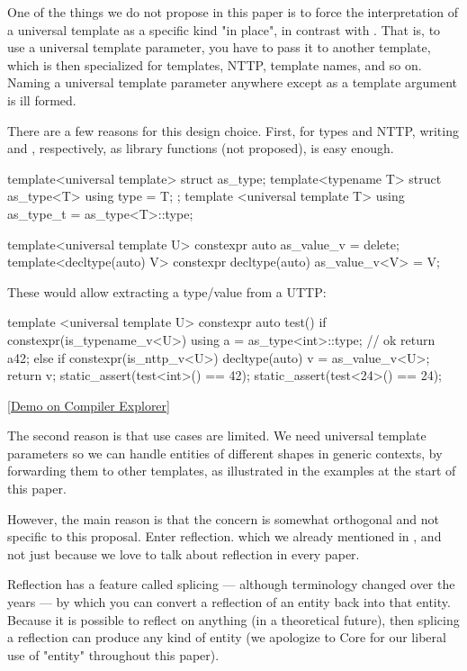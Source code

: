 \documentclass{wg21}
\begin{document}
One of the things we do not propose in this paper is to force the interpretation of a universal template as a specific kind "in place", in contrast with .
That is, to use a universal template parameter, you have to pass it to another template, which is then specialized for templates, NTTP, template names, and so on.
Naming a universal template parameter anywhere except as a template argument is ill formed.

There are a few reasons for this design choice.
First, for types and NTTP, writing  and , respectively, as library functions (not proposed), is easy enough.

\begin{colorblock}
template<universal template>
struct as_type;
template<typename T>
struct as_type<T> { using type = T; };
template <universal template T>
using as_type_t = as_type<T>::type;

template<universal template U>
constexpr auto as_value_v = delete;
template<decltype(auto) V>
constexpr decltype(auto) as_value_v<V> = V;
\end{colorblock}

These would allow extracting a type/value from a UTTP:

\begin{colorblock}
template <universal template U>
constexpr auto test() {
    if constexpr(is_typename_v<U>) {
        using a =  as_type<int>::type; // ok
        return a{42};
    }
    else if constexpr(is_nttp_v<U>) {
        decltype(auto) v = as_value_v<U>;
        return v;
    }
}
static_assert(test<int>() == 42);
static_assert(test<24>() == 24);
\end{colorblock}

\href{https://godbolt.org/z/oTPGvEYoa}{[Demo on Compiler Explorer]}

The second reason is that use cases are limited.
We need universal template parameters so we can handle entities of different shapes in generic contexts, by forwarding them to other templates, as illustrated in the examples at the start of this paper.

However, the main reason is that the concern is somewhat orthogonal and not specific to this proposal.
Enter reflection. which we already mentioned in , and not just because we love to talk about reflection in every paper.

Reflection has a feature called splicing --- although terminology changed over the years --- by which you can convert a reflection of an entity
back into that entity. Because it is possible to reflect on anything (in a theoretical future), then splicing a reflection
can produce any kind of entity (we apologize to Core for our liberal use of "entity" throughout this paper).
\end{document}
